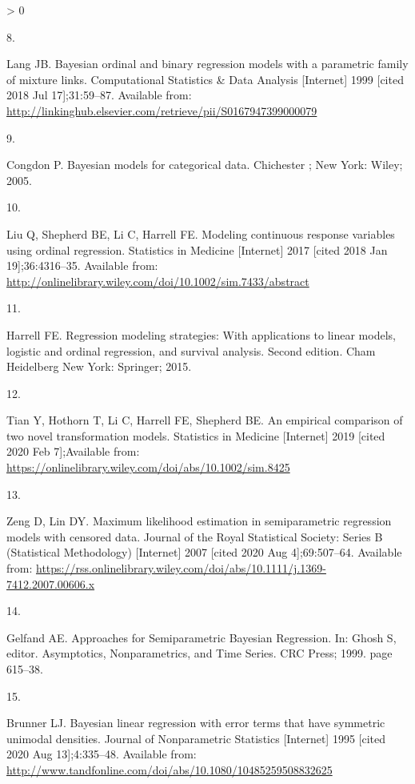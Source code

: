 \documentclass[
]{article}
\newlength{\cslhangindent}
\newlength{\csllabelwidth}
\newenvironment{CSLReferences}[2] %
 {%
  \setlength{\parindent}{0pt}
  \ifodd #1 \everypar{\setlength{\hangindent}{\cslhangindent}}\ignorespaces\fi
  \ifnum #2 > 0
  \setlength{\parskip}{#2\baselineskip}
  \fi
 }%
 {}
\newcommand{\CSLLeftMargin}[1]{\parbox[t]{\csllabelwidth}{#1}}
\newcommand{\CSLRightInline}[1]{\parbox[t]{\linewidth - \csllabelwidth}{#1}\break}
\begin{document}
\begin{CSLReferences}{0}{0}
\leavevmode\hypertarget{ref-lang_bayesian_1999}{}%
\CSLLeftMargin{8. }
\CSLRightInline{Lang JB. Bayesian ordinal and binary regression models with a parametric family of mixture links. Computational Statistics \& Data Analysis {[}Internet{]} 1999 {[}cited 2018 Jul 17{]};31:59--87. Available from: \url{http://linkinghub.elsevier.com/retrieve/pii/S0167947399000079}}

\leavevmode\hypertarget{ref-congdon_bayesian_2005}{}%
\CSLLeftMargin{9. }
\CSLRightInline{Congdon P. Bayesian models for categorical data. Chichester ; New York: Wiley; 2005. }

\leavevmode\hypertarget{ref-liu_modeling_2017}{}%
\CSLLeftMargin{10. }
\CSLRightInline{Liu Q, Shepherd BE, Li C, Harrell FE. Modeling continuous response variables using ordinal regression. Statistics in Medicine {[}Internet{]} 2017 {[}cited 2018 Jan 19{]};36:4316--35. Available from: \url{http://onlinelibrary.wiley.com/doi/10.1002/sim.7433/abstract}}

\leavevmode\hypertarget{ref-harrell_regression_2015}{}%
\CSLLeftMargin{11. }
\CSLRightInline{Harrell FE. Regression modeling strategies: With applications to linear models, logistic and ordinal regression, and survival analysis. Second edition. Cham Heidelberg New York: Springer; 2015. }

\leavevmode\hypertarget{ref-tian_empirical_2019}{}%
\CSLLeftMargin{12. }
\CSLRightInline{Tian Y, Hothorn T, Li C, Harrell FE, Shepherd BE. An empirical comparison of two novel transformation models. Statistics in Medicine {[}Internet{]} 2019 {[}cited 2020 Feb 7{]};Available from: \url{https://onlinelibrary.wiley.com/doi/abs/10.1002/sim.8425}}

\leavevmode\hypertarget{ref-zeng_maximum_2007}{}%
\CSLLeftMargin{13. }
\CSLRightInline{Zeng D, Lin DY. Maximum likelihood estimation in semiparametric regression models with censored data. Journal of the Royal Statistical Society: Series B (Statistical Methodology) {[}Internet{]} 2007 {[}cited 2020 Aug 4{]};69:507--64. Available from: \url{https://rss.onlinelibrary.wiley.com/doi/abs/10.1111/j.1369-7412.2007.00606.x}}

\leavevmode\hypertarget{ref-gelfand_approaches_1999}{}%
\CSLLeftMargin{14. }
\CSLRightInline{Gelfand AE. Approaches for {Semiparametric} {Bayesian} {Regression}. In: Ghosh S, editor. Asymptotics, {Nonparametrics}, and {Time} {Series}. CRC Press; 1999. page 615--38.}

\leavevmode\hypertarget{ref-brunner_bayesian_1995}{}%
\CSLLeftMargin{15. }
\CSLRightInline{Brunner LJ. Bayesian linear regression with error terms that have symmetric unimodal densities. Journal of Nonparametric Statistics {[}Internet{]} 1995 {[}cited 2020 Aug 13{]};4:335--48. Available from: \url{http://www.tandfonline.com/doi/abs/10.1080/10485259508832625}}


\end{CSLReferences}
\end{document}
